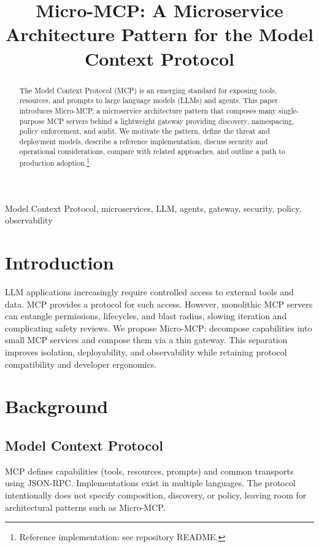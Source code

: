 \documentclass[conference]{IEEEtran}
\title{Micro-MCP: A Microservice Architecture Pattern for the Model Context Protocol}
\author{\IEEEauthorblockN{Malik Abualzait}
\IEEEauthorblockA{\textit{Independent Researcher}\\
Email: malik.abualzait@example.com}}
\begin{document}
\maketitle

\begin{abstract}
The Model Context Protocol (MCP) is an emerging standard for exposing tools, resources, and prompts to large language models (LLMs) and agents. This paper introduces Micro-MCP, a microservice architecture pattern that composes many single-purpose MCP servers behind a lightweight gateway providing discovery, namespacing, policy enforcement, and audit. We motivate the pattern, define the threat and deployment models, describe a reference implementation, discuss security and operational considerations, compare with related approaches, and outline a path to production adoption.\footnote{Reference implementation: see repository README.}
\end{abstract}

\begin{IEEEkeywords}
Model Context Protocol, microservices, LLM, agents, gateway, security, policy, observability
\end{IEEEkeywords}

\section{Introduction}
LLM applications increasingly require controlled access to external tools and data. MCP\cite{mcp-wiki} provides a protocol for such access. However, monolithic MCP servers can entangle permissions, lifecycles, and blast radius, slowing iteration and complicating safety reviews. We propose Micro-MCP: decompose capabilities into small MCP services and compose them via a thin gateway. This separation improves isolation, deployability, and observability while retaining protocol compatibility and developer ergonomics.

\section{Background}
\subsection{Model Context Protocol}
MCP defines capabilities (tools, resources, prompts) and common transports using JSON-RPC\cite{jsonrpc}. Implementations exist in multiple languages. The protocol intentionally does not specify composition, discovery, or policy, leaving room for architectural patterns such as Micro-MCP.
\end{document}
